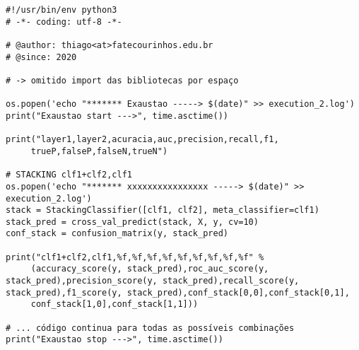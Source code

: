 \begin{verbatim}
#!/usr/bin/env python3
# -*- coding: utf-8 -*-

# @author: thiago<at>fatecourinhos.edu.br
# @since: 2020

# -> omitido import das bibliotecas por espaço 

os.popen('echo "******* Exaustao -----> $(date)" >> execution_2.log')
print("Exaustao start --->", time.asctime())

print("layer1,layer2,acuracia,auc,precision,recall,f1,
     trueP,falseP,falseN,trueN")

# STACKING clf1+clf2,clf1
os.popen('echo "******* xxxxxxxxxxxxxxxx -----> $(date)" >> execution_2.log')
stack = StackingClassifier([clf1, clf2], meta_classifier=clf1)
stack_pred = cross_val_predict(stack, X, y, cv=10)
conf_stack = confusion_matrix(y, stack_pred)

print("clf1+clf2,clf1,%f,%f,%f,%f,%f,%f,%f,%f,%f" %
     (accuracy_score(y, stack_pred),roc_auc_score(y, stack_pred),precision_score(y, stack_pred),recall_score(y, stack_pred),f1_score(y, stack_pred),conf_stack[0,0],conf_stack[0,1],
     conf_stack[1,0],conf_stack[1,1]))

# ... código continua para todas as possíveis combinações 
print("Exaustao stop --->", time.asctime())\end{verbatim}